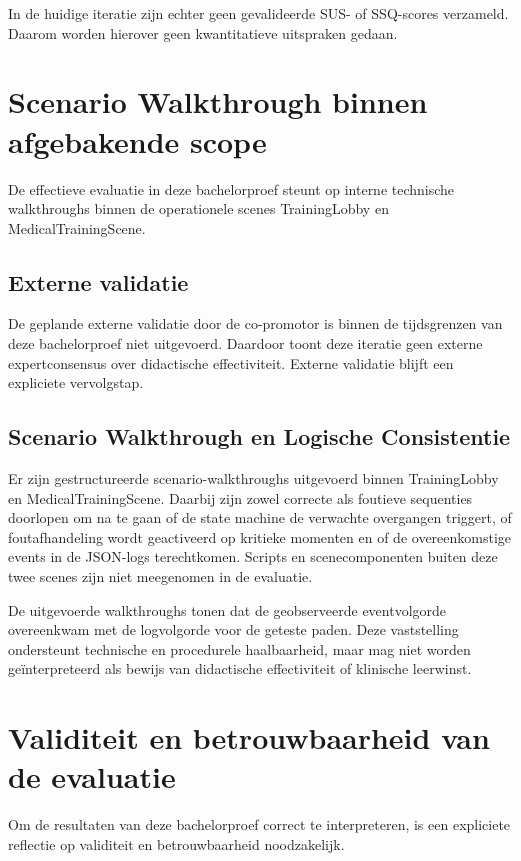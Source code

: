 In de huidige iteratie zijn echter geen gevalideerde SUS- of SSQ-scores verzameld. Daarom worden hierover geen kwantitatieve uitspraken gedaan.

\section{Scenario Walkthrough binnen afgebakende scope}

De effectieve evaluatie in deze bachelorproef steunt op interne technische walkthroughs binnen de operationele scenes TrainingLobby en MedicalTrainingScene.

\subsection{Externe validatie}
De geplande externe validatie door de co-promotor is binnen de tijdsgrenzen van deze bachelorproef niet uitgevoerd. Daardoor toont deze iteratie geen externe expertconsensus over didactische effectiviteit. Externe validatie blijft een expliciete vervolgstap.

\subsection{Scenario Walkthrough en Logische Consistentie}

Er zijn gestructureerde scenario-walkthroughs uitgevoerd binnen TrainingLobby en MedicalTrainingScene. Daarbij zijn zowel correcte als foutieve sequenties doorlopen om na te gaan of de state machine de verwachte overgangen triggert, of foutafhandeling wordt geactiveerd op kritieke momenten en of de overeenkomstige events in de JSON-logs terechtkomen. Scripts en scenecomponenten buiten deze twee scenes zijn niet meegenomen in de evaluatie.

De uitgevoerde walkthroughs tonen dat de geobserveerde eventvolgorde overeenkwam met de logvolgorde voor de geteste paden. Deze vaststelling ondersteunt technische en procedurele haalbaarheid, maar mag niet worden geïnterpreteerd als bewijs van didactische effectiviteit of klinische leerwinst.

\section{Validiteit en betrouwbaarheid van de evaluatie}

Om de resultaten van deze bachelorproef correct te interpreteren, is een expliciete reflectie op validiteit en betrouwbaarheid noodzakelijk.

